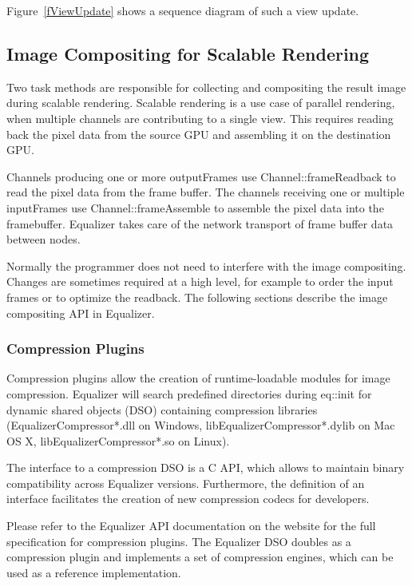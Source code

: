 \documentclass[10pt,a4]{scrartcl}
\newcommand{\fig}[1]{Figure~\ref{#1}}
\begin{document}
\fig{fViewUpdate} shows a sequence diagram of such a view update.


\subsection{\label{sCompositing}Image Compositing for Scalable Rendering}

Two task methods are responsible for collecting and compositing the
result image during scalable rendering. Scalable rendering is a use case
of parallel rendering, when multiple channels are contributing to a single
view. This requires reading back the pixel data from the source GPU and
assembling it on the destination GPU.

Channels producing one or more \textsf{outputFrame}s use
\textsf{Channel::frame\-Read\-back} to read the pixel data from the frame
buffer. The channels receiving one or multiple \textsf{inputFrame}s use
\textsf{Channel::frameAssemb\-le} to assemble the pixel data into the
framebuffer. Equalizer takes care of the network transport of frame buffer data
between nodes.

Normally the programmer does not need to interfere with the image
compositing. Changes are sometimes required at a high level, for example
to order the input frames or to optimize the readback. The following
sections describe the image compositing API in Equalizer.

\subsubsection{Compression Plugins}

Compression plugins allow the creation of runtime-loadable modules for
image compression. Equalizer will search predefined directories during
\textsf{eq::init} for dynamic shared objects (DSO) containing compression
libraries (EqualizerCompressor*.dll on Windows, libEqualizerCompressor*.dylib
on Mac OS X, libEqualizerCompressor*.so on Linux).

The interface to a compression DSO is a C API, which allows to maintain
binary compatibility across Equalizer versions. Furthermore, the
definition of an interface facilitates the creation of new compression
codecs for developers. 

Please refer to the Equalizer API documentation on the website for the
full specification for compression plugins. The Equalizer DSO doubles as
a compression plugin and implements a set of compression engines, which
can be used as a reference implementation.
\end{document}
